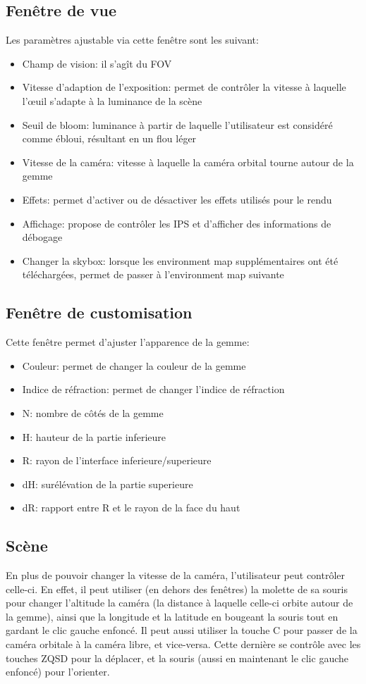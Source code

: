 \documentclass[a4paper,12pt]{article}
\begin{document}
\subsection{Fenêtre de vue}
Les paramètres ajustable via cette fenêtre sont les suivant:
\begin{itemize}
    \item Champ de vision: il s'agît du FOV
    \item Vitesse d'adaption de l'exposition: permet de contrôler la vitesse à laquelle l'œuil s'adapte à la luminance de la scène
    \item Seuil de bloom: luminance à partir de laquelle l'utilisateur est considéré comme ébloui, résultant en un flou léger
    \item Vitesse de la caméra: vitesse à laquelle la caméra orbital tourne autour de la gemme
    \item Effets: permet d'activer ou de désactiver les effets utilisés pour le rendu
    \item Affichage: propose de contrôler les IPS et d'afficher des informations de débogage
    \item Changer la skybox: lorsque les environment map supplémentaires ont été téléchargées, permet de passer à l'environment map suivante
\end{itemize}

\subsection{Fenêtre de customisation}
Cette fenêtre permet d'ajuster l'apparence de la gemme:
\begin{itemize}
    \item Couleur: permet de changer la couleur de la gemme
    \item Indice de réfraction: permet de changer l'indice de réfraction
    \item N: nombre de côtés de la gemme
    \item H: hauteur de la partie inferieure
    \item R: rayon de l'interface inferieure/superieure
    \item dH: surélévation de la partie superieure
    \item dR: rapport entre R et le rayon de la face du haut
\end{itemize}

\subsection{Scène}
En plus de pouvoir changer la vitesse de la caméra, l'utilisateur peut contrôler celle-ci. En effet,
il peut utiliser (en dehors des fenêtres) la molette de sa souris pour changer l'altitude la caméra
(la distance à laquelle celle-ci orbite autour de la gemme), ainsi que la longitude et la latitude
en bougeant la souris tout en gardant le clic gauche enfoncé. Il peut aussi utiliser la touche C pour
passer de la caméra orbitale à la caméra libre, et vice-versa. Cette dernière se contrôle avec les
touches ZQSD pour la déplacer, et la souris (aussi en maintenant le clic gauche enfoncé)
pour l'orienter.
\end{document}
